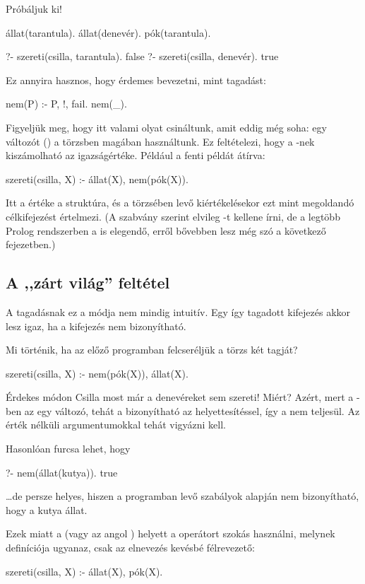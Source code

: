 Próbáljuk ki!
\begin{program}
állat(tarantula).
állat(denevér).
pók(tarantula).
\end{program}
\begin{query}
?- szereti(csilla, tarantula).
false
?- szereti(csilla, denevér).
true
\end{query}
Ez annyira hasznos, hogy érdemes bevezetni, mint
tagadást:
\begin{program}
nem(P) :- P, !, fail.
nem(_).
\end{program}

Figyeljük meg, hogy itt valami olyat csináltunk,
amit eddig még soha: egy változót () a
törzsben magában használtunk. Ez feltételezi, hogy a
-nek kiszámolható az igazságértéke. Például a
fenti példát átírva:
\begin{program}
szereti(csilla, X) :- állat(X), nem(pók(X)).
\end{program}
Itt a  értéke a  struktúra, és a
 törzsében levő  kiértékelésekor ezt
mint megoldandó célkifejezést értelmezi.
(A szabvány szerint elvileg -t kellene írni,
de a legtöbb Prolog rendszerben a  is elegendő,
erről bővebben lesz még szó a következő fejezetben.)

\subsection*{A ,,zárt világ'' feltétel}
A tagadásnak ez a módja nem mindig intuitív. Egy így
tagadott kifejezés akkor lesz igaz, ha a kifejezés
nem bizonyítható.

Mi történik, ha az előző programban felcseréljük a
törzs két tagját?
\begin{program}
szereti(csilla, X) :- nem(pók(X)), állat(X).
\end{program}
Érdekes módon Csilla most már a denevéreket sem
szereti! Miért? Azért, mert a -ben
az  egy változó, tehát a 
bizonyítható az  helyettesítéssel,
így a  nem teljesül. Az érték
nélküli argumentumokkal tehát vigyázni kell.

Hasonlóan furcsa lehet, hogy
\begin{query}
?- nem(állat(kutya)).
true
\end{query}
\dots de persze helyes, hiszen a programban levő
szabályok alapján nem bizonyítható, hogy a kutya
állat.

Ezek miatt a  (vagy az angol )
helyett a \pr{\textbackslash+} operátort szokás
használni, melynek definíciója ugyanaz, csak az
elnevezés kevésbé félrevezető:
\begin{program}
szereti(csilla, X) :- állat(X), \+ pók(X).
\end{program}
\index{\pr{\textbackslash+}}

